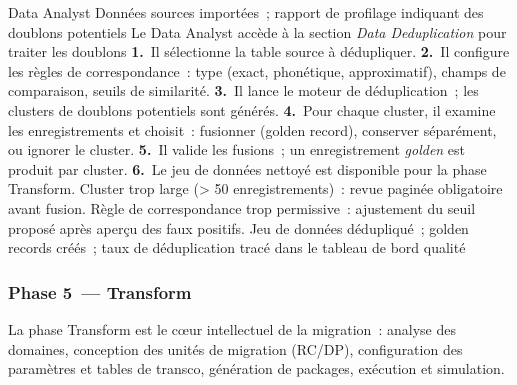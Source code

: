   {Data Analyst}
  {Données sources importées~; rapport de profilage indiquant des doublons potentiels}
  {Le Data Analyst accède à la section \textit{Data Deduplication} pour traiter les doublons}
  {\textbf{1.}~Il sélectionne la table source à dédupliquer.\newline
   \textbf{2.}~Il configure les règles de correspondance~: type (exact, phonétique, approximatif), champs de comparaison, seuils de similarité.\newline
   \textbf{3.}~Il lance le moteur de déduplication~; les clusters de doublons potentiels sont générés.\newline
   \textbf{4.}~Pour chaque cluster, il examine les enregistrements et choisit~: fusionner (golden record), conserver séparément, ou ignorer le cluster.\newline
   \textbf{5.}~Il valide les fusions~; un enregistrement \textit{golden} est produit par cluster.\newline
   \textbf{6.}~Le jeu de données nettoyé est disponible pour la phase Transform.}
  {Cluster trop large (> 50 enregistrements)~: revue paginée obligatoire avant fusion. Règle de correspondance trop permissive~: ajustement du seuil proposé après aperçu des faux positifs.}
  {Jeu de données dédupliqué~; golden records créés~; taux de déduplication tracé dans le tableau de bord qualité}
\fi %

\subsubsection*{Phase 5~--- Transform}
\label{subsubsec:uc-phase5}

La phase Transform est le cœur intellectuel de la migration~: analyse des domaines, conception des unités de migration (RC/DP), configuration des paramètres et tables de transco, génération de packages, exécution et simulation.

